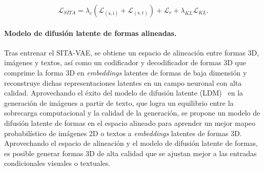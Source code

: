 \documentclass[../../book-main_es.tex]{subfiles}
\begin{document}
\begin{equation}
\mathcal{L}_{SITA} = \lambda_c (\mathcal{L}_{(\mathrm{s},\mathrm{i})}
+ \mathcal{L}_{(\mathrm{s},\mathrm{t})}) + \mathcal{L}_r +
\lambda_{KL} \mathcal{L}_{KL}.
\label{eq:sita_vae}
\end{equation}

\paragraph{Modelo de difusión latente de formas alineadas.}
Tras entrenar el SITA-VAE, se obtiene un espacio de alineación entre formas 3D,
imágenes y textos, así como un codificador y
decodificador de formas 3D que comprime la forma 3D en \textit{embeddings} latentes de formas de baja dimensión
y reconstruye dichas representaciones latentes en un campo neuronal
con alta calidad. Aprovechando el éxito del modelo de difusión latente
(LDM)~\cite{rombach2022high} en la generación de imágenes a partir de texto, que
logra un equilibrio entre la sobrecarga computacional y la calidad de la generación,
se propone un modelo de difusión latente de formas en el espacio alineado
para aprender un mejor mapeo probabilístico de imágenes 2D o textos
a \textit{embeddings} latentes de formas 3D. Aprovechando el espacio de alineación y
el modelo de difusión latente de formas, es posible generar
formas 3D de alta calidad que se ajustan mejor a las entradas condicionales visuales o textuales.
\end{document}
